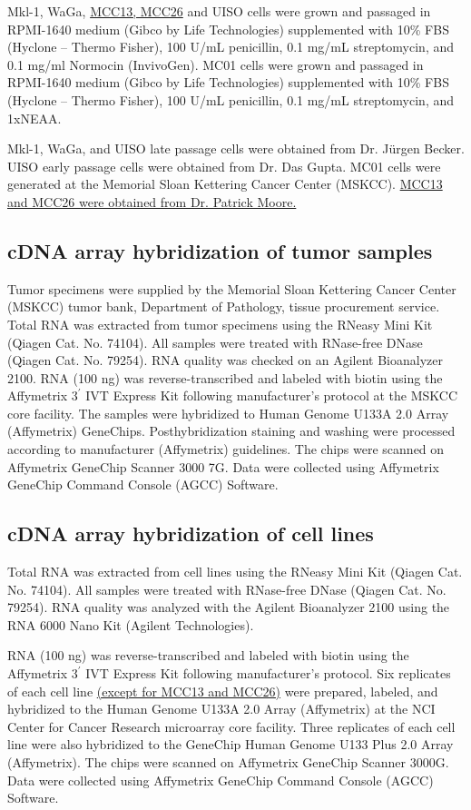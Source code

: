 \documentclass[10pt]{article}
\begin{document}
Mkl-1, WaGa, \uline{MCC13, MCC26} and UISO cells were grown and passaged in RPMI-1640 medium (Gibco by Life Technologies) supplemented with 10\% FBS (Hyclone – Thermo Fisher), 100 U/mL penicillin, 0.1 mg/mL streptomycin, and 0.1 mg/ml Normocin (InvivoGen).
MC01 cells were grown and passaged in RPMI-1640 medium (Gibco by Life Technologies) supplemented with 10\% FBS (Hyclone – Thermo Fisher), 100 U/mL penicillin, 0.1 mg/mL streptomycin, and 1xNEAA.

Mkl-1, WaGa, and UISO late passage cells were obtained from Dr. J\"{u}rgen Becker.
UISO early passage cells were obtained from Dr. Das Gupta.
MC01 cells were generated at the Memorial Sloan Kettering Cancer Center (MSKCC).
\uline{MCC13 and MCC26 were obtained from Dr. Patrick Moore.}

\subsection*{cDNA array hybridization of tumor samples}
Tumor specimens were supplied by the Memorial Sloan Kettering Cancer Center (MSKCC) tumor bank, Department of Pathology, tissue procurement service.
Total RNA was extracted from tumor specimens using the RNeasy Mini Kit (Qiagen Cat. No. 74104).
All samples were treated with RNase-free DNase (Qiagen Cat. No. 79254).
RNA quality was checked on an Agilent Bioanalyzer 2100.
RNA (100 ng) was reverse-transcribed and labeled with biotin using the Affymetrix $3^{\prime}$ IVT Express Kit following manufacturer's protocol at the MSKCC core facility.
The samples were hybridized to Human Genome U133A 2.0 Array (Affymetrix) GeneChips.
Posthybridization staining and washing were processed according to manufacturer (Affymetrix) guidelines.
The chips were scanned on Affymetrix GeneChip Scanner 3000 7G.
Data were collected using Affymetrix GeneChip Command Console (AGCC) Software.


\subsection*{cDNA array hybridization of cell lines}

Total RNA was extracted from cell lines using the RNeasy Mini Kit (Qiagen Cat. No. 74104).
All samples were treated with RNase-free DNase (Qiagen Cat. No. 79254).
RNA quality was analyzed with the Agilent Bioanalyzer 2100 using the RNA 6000 Nano Kit (Agilent Technologies).

RNA (100 ng) was reverse-transcribed and labeled with biotin using the Affymetrix $3^{\prime}$ IVT Express Kit following manufacturer's protocol.
Six replicates of each cell line \uline{(except for MCC13 and MCC26)} were prepared, labeled, and hybridized to the Human Genome U133A 2.0 Array (Affymetrix) at the NCI Center for Cancer Research microarray core facility.
Three replicates of each cell line were also hybridized to the GeneChip Human Genome U133 Plus 2.0 Array (Affymetrix).
The chips were scanned on Affymetrix GeneChip Scanner 3000G.
Data were collected using Affymetrix GeneChip Command Console (AGCC) Software.
\end{document}
